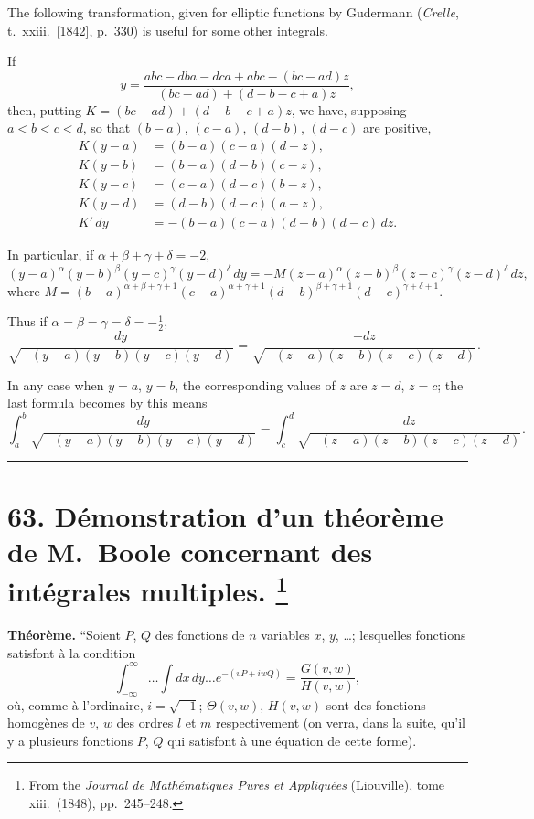 \documentclass[11pt,a4paper]{book}
\begin{document}
The following transformation, given for elliptic functions by Gudermann (\textit{Crelle},
t.~xxiii.\ [1842], p.~330) is useful for some other integrals.

If
\[
y = \frac{abc - dba - dca + abc - (bc - ad)z}{(bc - ad) + (d - b - c + a)z},
\]
then, putting $K = (bc - ad) + (d - b - c + a)z$,
we have, supposing $a < b < c < d$, so that $(b-a)$, $(c-a)$, $(d-b)$, $(d-c)$ are positive,
\begin{align*}
K(y-a) &= (b-a)(c-a)(d-z), \\
K(y-b) &= (b-a)(d-b)(c-z), \\
K(y-c) &= (c-a)(d-c)(b-z), \\
K(y-d) &= (d-b)(d-c)(a-z), \\
K'\,dy &= -(b-a)(c-a)(d-b)(d-c)\,dz.
\end{align*}

In particular, if $\alpha + \beta + \gamma + \delta = -2$,
\[
(y-a)^\alpha (y-b)^\beta (y-c)^\gamma (y-d)^\delta\,dy
= -M (z-a)^\alpha (z-b)^\beta (z-c)^\gamma (z-d)^\delta\,dz,
\]
where $M = (b-a)^{\alpha+\beta+\gamma+1} (c-a)^{\alpha+\gamma+1} (d-b)^{\beta+\gamma+1} (d-c)^{\gamma+\delta+1}$.

Thus if $\alpha = \beta = \gamma = \delta = -\tfrac{1}{2}$,
\[
\frac{dy}{\sqrt{-(y-a)(y-b)(y-c)(y-d)}}
= \frac{-dz}{\sqrt{-(z-a)(z-b)(z-c)(z-d)}}.
\]

In any case when $y = a$, $y = b$, the corresponding values of $z$ are $z = d$, $z = c$; the
last formula becomes by this means
\[
\int_a^b \frac{dy}{\sqrt{-(y-a)(y-b)(y-c)(y-d)}}
= \int_c^d \frac{dz}{\sqrt{-(z-a)(z-b)(z-c)(z-d)}}.
\]

\bigskip
\hrule
\bigskip

\newpage
\section[D\'{e}monstration d'un th\'{e}or\`{e}me de M.~Boole concernant des int\'{e}grales multiples]{%
63. D\'{e}monstration d'un th\'{e}or\`{e}me de M.~Boole concernant des int\'{e}grales multiples.%
\footnote{From the \textit{Journal de Math\'{e}matiques Pures et Appliqu\'{e}es} (Liouville), tome xiii.\ (1848), pp.~245--248.}}

\textbf{Th\'{e}or\`{e}me.}
``Soient $P$, $Q$ des fonctions de $n$ variables $x$, $y$, \ldots; lesquelles fonctions
satisfont \`{a} la condition
\[
\int_{-\infty}^{\infty} \ldots \int dx\,dy\ldots e^{-(vP + iwQ)} = \frac{G(v,w)}{H(v,w)}, \tag{1}
\]
o\`{u}, comme \`{a} l'ordinaire, $i = \sqrt{-1}$; $\Theta(v,w)$, $H(v,w)$ sont des fonctions homog\`{e}nes
de $v$, $w$ des ordres $l$ et $m$ respectivement (on verra, dans la suite, qu'il y a plusieurs
fonctions $P$, $Q$ qui satisfont \`{a} une \'{e}quation de cette forme).
\end{document}

